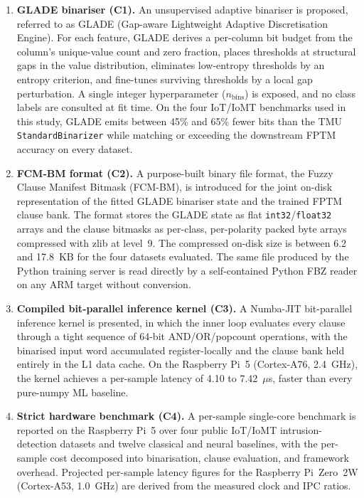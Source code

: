 \documentclass[journal,10pt]{IEEEtran}
\begin{document}
\begin{enumerate}
  \item \textbf{GLADE binariser (C1).}
        An unsupervised adaptive binariser is proposed, referred to
        as GLADE (Gap-aware Lightweight Adaptive Discretisation
        Engine). For each feature, GLADE derives a per-column bit
        budget from the column's unique-value count and zero fraction,
        places thresholds at structural gaps in the value distribution,
        eliminates low-entropy thresholds by an entropy criterion, and
        fine-tunes surviving thresholds by a local gap perturbation.
        A single integer hyperparameter ($n_\text{bins}$) is exposed,
        and no class labels are consulted at fit time. On the four
        IoT/IoMT benchmarks used in this study, GLADE emits between
        45\% and 65\% fewer bits than the TMU \texttt{StandardBinarizer}
        while matching or exceeding the downstream FPTM accuracy on
        every dataset.

  \item \textbf{FCM-BM format (C2).}
        A purpose-built binary file format, the Fuzzy Clause Manifest
        Bitmask (FCM-BM), is introduced for the joint on-disk
        representation of the fitted GLADE binariser state and the
        trained FPTM clause bank. The format stores the GLADE state as
        flat \texttt{int32}/\texttt{float32} arrays and the clause
        bitmasks as per-class, per-polarity packed byte arrays
        compressed with zlib at level~9. The compressed on-disk size
        is between 6.2 and 17.8~KB for the four datasets evaluated.
        The same file produced by the Python training server is read
        directly by a self-contained Python FBZ reader on any ARM target without
        conversion.

  \item \textbf{Compiled bit-parallel inference kernel (C3).}
        A Numba-JIT bit-parallel inference kernel is presented, in which the
        inner loop evaluates every clause through a tight sequence of
        64-bit AND/OR/popcount operations, with the binarised input
        word accumulated register-locally and the clause bank held
        entirely in the L1 data cache. On the Raspberry Pi~5 (Cortex-A76,
        2.4~GHz), the kernel achieves a per-sample latency of
        4.10 to 7.42~$\mu$s, faster than every pure-numpy ML baseline.

  \item \textbf{Strict hardware benchmark (C4).}
        A per-sample single-core benchmark is reported on the
        Raspberry Pi~5 over four public IoT/IoMT intrusion-detection
        datasets and twelve classical and neural baselines, with the
        per-sample cost decomposed into binarisation, clause
        evaluation, and framework overhead. Projected per-sample
        latency figures for the Raspberry Pi~Zero~2W
        (Cortex-A53, 1.0~GHz) are derived from the measured clock
        and IPC ratios.
\end{enumerate}
\end{document}
